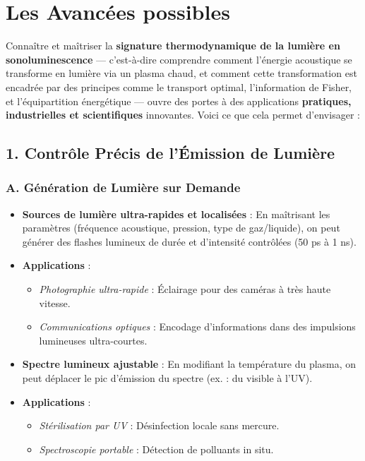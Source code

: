 \documentclass[a4paper,12pt]{article}
\begin{document}
\newpage
\section{Les Avancées possibles}
Connaître et maîtriser la \textbf{signature thermodynamique de la lumière en sonoluminescence} — c’est-à-dire comprendre comment l’énergie acoustique se transforme en lumière via un plasma chaud, et comment cette transformation est encadrée par des principes comme le transport optimal, l’information de Fisher, et l’équipartition énergétique — ouvre des portes à des applications \textbf{pratiques, industrielles et scientifiques} innovantes. Voici ce que cela permet d’envisager :

\subsection*{1. Contrôle Précis de l’Émission de Lumière}
\subsubsection*{A. Génération de Lumière sur Demande}
\begin{itemize}
    \item \textbf{Sources de lumière ultra-rapides et localisées} : En maîtrisant les paramètres (fréquence acoustique, pression, type de gaz/liquide), on peut générer des flashes lumineux de durée et d’intensité contrôlées (50 ps à 1 ns).
    \item \textbf{Applications} :
    \begin{itemize}
        \item \textit{Photographie ultra-rapide} : Éclairage pour des caméras à très haute vitesse.
        \item \textit{Communications optiques} : Encodage d’informations dans des impulsions lumineuses ultra-courtes.
    \end{itemize}
    \item \textbf{Spectre lumineux ajustable} : En modifiant la température du plasma, on peut déplacer le pic d’émission du spectre (ex. : du visible à l’UV).
    \item \textbf{Applications} :
    \begin{itemize}
        \item \textit{Stérilisation par UV} : Désinfection locale sans mercure.
        \item \textit{Spectroscopie portable} : Détection de polluants in situ.
    \end{itemize}
\end{itemize}
\end{document}

